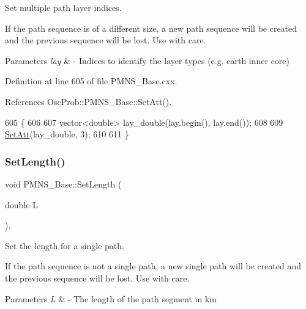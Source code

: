 Set multiple path layer indices.

If the path sequence is of a different size, a new path sequence will be created and the previous sequence will be lost. Use with care.


\begin{DoxyParams}{Parameters}
{\em lay} & -\/ Indices to identify the layer types (e.\+g. earth inner core) \\
\hline
\end{DoxyParams}


Definition at line 605 of file P\+M\+N\+S\+\_\+\+Base.\+cxx.



References Osc\+Prob\+::\+P\+M\+N\+S\+\_\+\+Base\+::\+Set\+Att().


\begin{DoxyCode}
605                                            \{
606 
607   vector<double> lay\_double(lay.begin(), lay.end());
608 
609   \hyperlink{classOscProb_1_1PMNS__Base_aba565962a440d14bee7a2a96d2eca2c5}{SetAtt}(lay\_double, 3);
610 
611 \}
\end{DoxyCode}
\mbox{\label{classOscProb_1_1PMNS__Base_a6241325b1bd28cafa556daaecbe4ed62}} 
\subsubsection{\texorpdfstring{Set\+Length()}{SetLength()}\hspace{0.1cm}{\footnotesize\ttfamily [1/2]}}
{\footnotesize\ttfamily void P\+M\+N\+S\+\_\+\+Base\+::\+Set\+Length (\begin{DoxyParamCaption}\item[{double}]{L }\end{DoxyParamCaption})\hspace{0.3cm}{\ttfamily [virtual]}, {\ttfamily [inherited]}}

Set the length for a single path.

If the path sequence is not a single path, a new single path will be created and the previous sequence will be lost. Use with care.


\begin{DoxyParams}{Parameters}
{\em L} & -\/ The length of the path segment in km \\
\hline
\end{DoxyParams}


